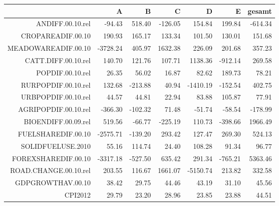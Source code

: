 \begin{table}[ht]
\centering
\begin{tabular}{rrrrrrr}
  \hline
 & A & B & C & D & E & gesamt \\ 
  \hline
ANDIFF.00.10.rel & -94.43 & 518.40 & -126.05 & 154.84 & 199.84 & -614.34 \\ 
  CROPAREADIF.00.10 & 190.93 & 165.17 & 133.34 & 101.50 & 130.01 & 151.68 \\ 
  MEADOWAREADIF.00.10 & -3728.24 & 405.97 & 1632.38 & 226.09 & 201.68 & 357.23 \\ 
  CATT.DIFF.00.10.rel & 140.70 & 121.76 & 107.71 & 1138.36 & -912.14 & 269.58 \\ 
  POPDIF.00.10.rel & 26.35 & 56.02 & 16.87 & 82.62 & 189.73 & 78.21 \\ 
  RURPOPDIF.00.10.rel & 132.68 & -213.88 & 40.94 & -1410.19 & -152.54 & 402.75 \\ 
  URBPOPDIF.00.10.rel & 44.57 & 44.81 & 22.94 & 83.88 & 105.87 & 77.91 \\ 
  AGRIPOPDIF.00.10.rel & -366.30 & -102.32 & 71.48 & -51.74 & -58.54 & -178.99 \\ 
  BIOENDIFF.00.09.rel & 519.56 & -66.77 & -225.19 & 110.73 & -398.66 & 1966.49 \\ 
  FUELSHAREDIF.00.10 & -2575.71 & -139.20 & 293.42 & 127.47 & 269.30 & 524.13 \\ 
  SOLIDFUELUSE.2010 & 55.16 & 114.74 & 24.40 & 108.28 & 91.34 & 96.77 \\ 
  FOREXSHAREDIF.00.10 & -3317.18 & -527.50 & 635.42 & 291.34 & -765.21 & 5363.46 \\ 
  ROAD.CHANGE.00.10.rel & 203.55 & 116.67 & 1661.07 & -5150.74 & 213.82 & 332.58 \\ 
  GDPGROWTHAV.00.10 & 38.42 & 29.75 & 44.46 & 43.19 & 31.10 & 45.56 \\ 
  CPI2012 & 29.79 & 23.20 & 28.96 & 23.85 & 23.88 & 44.51 \\ 
   \hline
\end{tabular}
\end{table}
